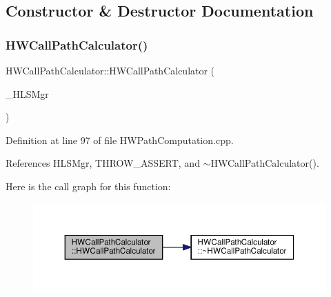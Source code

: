 \subsection{Constructor \& Destructor Documentation}
\mbox{\label{classHWCallPathCalculator_ac3b39ef9a827f6a1e01e675f713cc493}} 
\subsubsection{\texorpdfstring{H\+W\+Call\+Path\+Calculator()}{HWCallPathCalculator()}}
{\footnotesize\ttfamily H\+W\+Call\+Path\+Calculator\+::\+H\+W\+Call\+Path\+Calculator (\begin{DoxyParamCaption}\item[{const \hyperlink{hls__manager_8hpp_acd3842b8589fe52c08fc0b2fcc813bfe}{H\+L\+S\+\_\+manager\+Ref}}]{\+\_\+\+H\+L\+S\+Mgr }\end{DoxyParamCaption})}



Definition at line 97 of file H\+W\+Path\+Computation.\+cpp.



References H\+L\+S\+Mgr, T\+H\+R\+O\+W\+\_\+\+A\+S\+S\+E\+RT, and $\sim$\+H\+W\+Call\+Path\+Calculator().

Here is the call graph for this function\+:
\nopagebreak
\begin{figure}[H]
\begin{center}
\leavevmode
\includegraphics[width=350pt]{da/d67/classHWCallPathCalculator_ac3b39ef9a827f6a1e01e675f713cc493_cgraph}
\end{center}
\end{figure}
\mbox{\label{classHWCallPathCalculator_a6fe2e7835e140de731dab17331fa8512}} 
